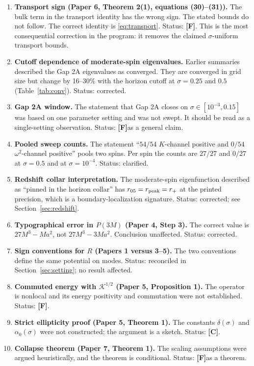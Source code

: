 \documentclass[11pt, a4paper]{article}
\newcommand{\CC}{\textcolor{cc}{\textbf{[C]}}}
\newcommand{\FF}{\textcolor{ff}{\textbf{[F]}}}
\theoremstyle{remark}
\theoremstyle{definition}
\begin{document}
\begin{enumerate}[leftmargin=*, label=E\arabic*.]
\item \textbf{Transport sign (Paper 6, Theorem 2(1), equations (30)--(31)).} The bulk term in the transport identity has the wrong sign. The stated bounds do not follow. The correct identity is \eqref{eq:transport}. Status: \FF. This is the most consequential correction in the program: it removes the claimed $\sigma$-uniform transport bounds.
\item \textbf{Cutoff dependence of moderate-spin eigenvalues.} Earlier summaries described the Gap 2A eigenvalues as converged. They are converged in grid size but change by 16--30\% with the horizon cutoff at $\sigma=0.25$ and $0.5$ (Table~\ref{tab:conv}). Status: corrected.
\item \textbf{Gap 2A window.} The statement that Gap 2A closes on $\sigma\in[10^{-3},0.15]$ was based on one parameter setting and was not swept. It should be read as a single-setting observation. Status: \FF as a general claim.
\item \textbf{Pooled sweep counts.} The statement ``$54/54$ $K$-channel positive and $0/54$ $\omega^2$-channel positive'' pools two spins. Per spin the counts are $27/27$ and $0/27$ at $\sigma=0.5$ and at $\sigma=10^{-4}$. Status: clarified.
\item \textbf{Redshift collar interpretation.} The moderate-spin eigenfunction described as ``pinned in the horizon collar'' has $r_{05} = r_{\rm peak} = r_+$ at the printed precision, which is a boundary-localization signature. Status: corrected; see Section~\ref{sec:redshift}.
\item \textbf{Typographical error in $P(3M)$ (Paper 4, Step 3).} The correct value is $27M^3 - Ma^2$, not $27M^3 - 3Ma^2$. Conclusion unaffected. Status: corrected.
\item \textbf{Sign conventions for $R$ (Papers 1 versus 3--5).} The two conventions define the same potential on modes. Status: reconciled in Section~\ref{sec:setting}; no result affected.
\item \textbf{Commuted energy with $\mathcal{K}^{1/2}$ (Paper 5, Proposition 1).} The operator is nonlocal and its energy positivity and commutation were not established. Status: \FF.
\item \textbf{Strict ellipticity proof (Paper 5, Theorem 1).} The constants $\delta(\sigma)$ and $\alpha_0(\sigma)$ were not constructed; the argument is a sketch. Status: \CC.
\item \textbf{Collapse theorem (Paper 7, Theorem 1).} The scaling assumptions were argued heuristically, and the theorem is conditional. Status: \FF as a theorem.

\end{enumerate}
\end{document}
